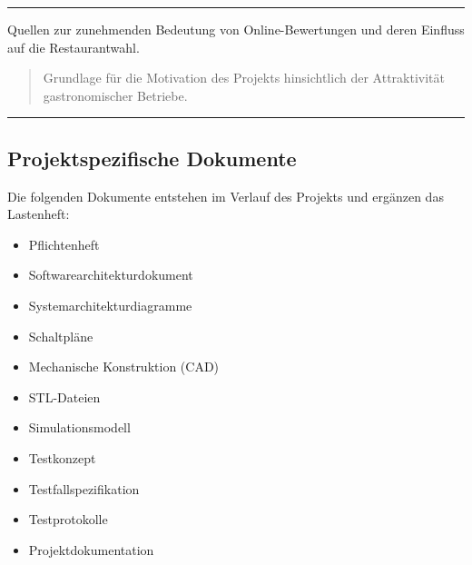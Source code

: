 \begin{center}\rule{0.5\linewidth}{0.5pt}\end{center}

Quellen zur zunehmenden Bedeutung von Online-Bewertungen und deren
Einfluss auf die Restaurantwahl.

\begin{quote}
Grundlage für die Motivation des Projekts hinsichtlich der Attraktivität
gastronomischer Betriebe.
\end{quote}

\begin{center}\rule{0.5\linewidth}{0.5pt}\end{center}

\subsection{Projektspezifische
Dokumente}\label{projektspezifische-dokumente}

Die folgenden Dokumente entstehen im Verlauf des Projekts und ergänzen
das Lastenheft:

\begin{itemize}
\tightlist
\item
  Pflichtenheft
\item
  Softwarearchitekturdokument
\item
  Systemarchitekturdiagramme
\item
  Schaltpläne
\item
  Mechanische Konstruktion (CAD)
\item
  STL-Dateien
\item
  Simulationsmodell
\item
  Testkonzept
\item
  Testfallspezifikation
\item
  Testprotokolle
\item
  Projektdokumentation
\end{itemize}
